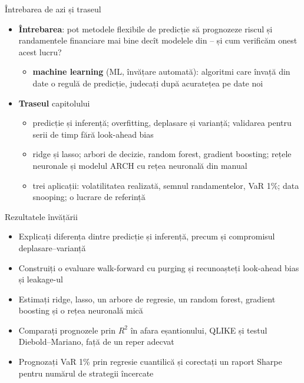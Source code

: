\begin{frame}{Întrebarea de azi și traseul}
\itemsize{\small}
\begin{itemize}
    \item \textbf{Întrebarea}: pot metodele flexibile de predicție să prognozeze riscul și randamentele financiare mai bine decît modelele din -- și cum verificăm onest acest lucru?
    \begin{itemize}
        \item \textbf{machine learning} (ML, învățare automată): algoritmi care învață din date o regulă de predicție, judecați după acuratețea pe date noi
    \end{itemize}
    \item \textbf{Traseul} capitolului
    \begin{itemize}
        \item predicție și inferență; overfitting, deplasare și varianță; validarea pentru serii de timp fără look-ahead bias
        \item ridge și lasso; arbori de decizie, random forest, gradient boosting; rețele neuronale și modelul ARCH cu rețea neuronală din manual
        \item trei aplicații: volatilitatea realizată, semnul randamentelor, VaR 1\%; data snooping; o lucrare de referință
    \end{itemize}
\end{itemize}
\end{frame}

\begin{frame}{Rezultatele învățării}
\itemsize{\small}
\begin{itemize}
    \item Explicați diferența dintre predicție și inferență, precum și compromisul deplasare--varianță
    \item Construiți o evaluare walk-forward cu purging și recunoașteți look-ahead bias și leakage-ul
    \item Estimați ridge, lasso, un arbore de regresie, un random forest, gradient boosting și o rețea neuronală mică
    \item Comparați prognozele prin $R^2$ în afara eșantionului, QLIKE și testul Diebold--Mariano, față de un reper adecvat
    \item Prognozați VaR 1\% prin regresie cuantilică și corectați un raport Sharpe pentru numărul de strategii încercate
\end{itemize}
\end{frame}

